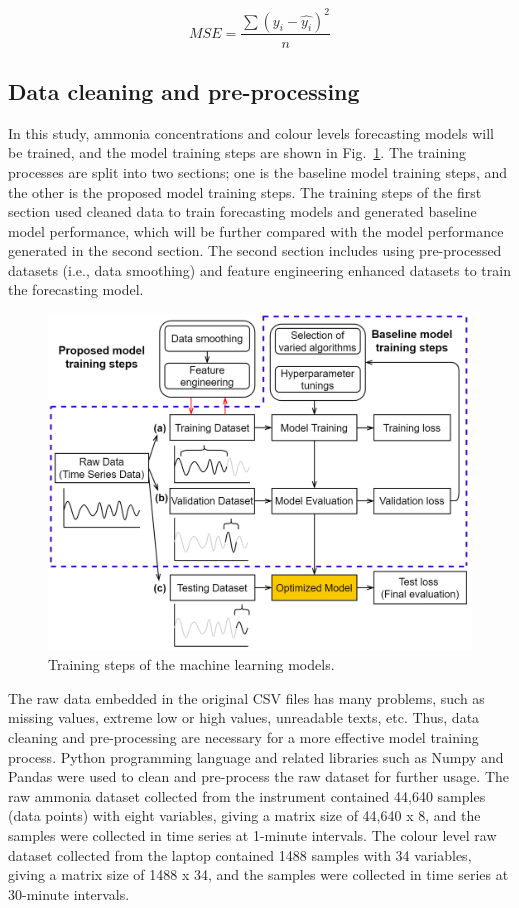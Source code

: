 \begin{equation}\label{eq-mse}
    MSE=\frac{\sum (y_i-\hat{y_i})^2}{n}
\end{equation}

\subsection{Data cleaning and pre-processing}
In this study, ammonia concentrations and colour levels forecasting models will be trained, and the model training steps are shown in Fig.~\ref{fig:training-scheme}. The training processes are split into two sections; one is the baseline model training steps, and the other is the proposed model training steps. The training steps of the first section used cleaned data to train forecasting models and generated baseline model performance, which will be further compared with the model performance generated in the second section. The second section includes using pre-processed datasets (i.e., data smoothing) and feature engineering enhanced datasets to train the forecasting model. 

\begin{figure}[h]
    \centering
    \includegraphics[width=0.9\columnwidth]{imgs/pre-processing/training-scheme.png}
    \caption{Training steps of the machine learning models.}
    \label{fig:training-scheme}
\end{figure}

The raw data embedded in the original CSV files has many problems, such as missing values, extreme low or high values, unreadable texts, etc. Thus, data cleaning and pre-processing are necessary for a more effective model training process. Python programming language and related libraries such as Numpy and Pandas were used to clean and pre-process the raw dataset for further usage. The raw ammonia dataset collected from the instrument contained 44,640 samples (data points) with eight variables, giving a matrix size of 44,640 x 8, and the samples were collected in time series at 1-minute intervals. The colour level raw dataset collected from the laptop contained 1488 samples with 34 variables, giving a matrix size of 1488 x 34, and the samples were collected in time series at 30-minute intervals.

